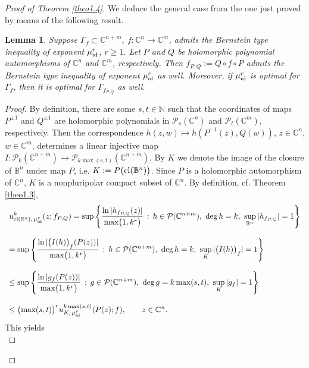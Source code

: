 \documentclass[11pt, oneside]{amsart}
\newtheorem{Lm}[Th]{Lemma}
\begin{document}
\begin{proof}[Proof of Theorem \ref{theo1.4}]
We deduce the general case from the one just proved by means of the following result.
\begin{Lm}\label{lem4.1}
Suppose $\Gamma_f\subset\mathbb C^{n+m}$, $f:\mathbb C^n\rightarrow\mathbb C^m$, admits the Bernstein type inequality of exponent $\mu_{{\rm id}}^r$, $r\ge 1$. Let $P$ and $Q$ be holomorphic polynomial automorphisms of $\mathbb C^n$ and $\mathbb C^m$, respectively. Then $f_{P,Q}:=Q\circ f\circ P$ admits the Bernstein type inequality of exponent $\mu_{{\rm id}}^r$ as well. Moreover, if $\mu_{{\rm id}}^r$ is optimal for $\Gamma_f$, then it is optimal for $\Gamma_{f_{P,Q}}$ as well.
\end{Lm}
\begin{proof}
By definition, there are some $s, t\in\mathbb N$ such that the coordinates of maps $P^{\pm 1}$ and $Q^{\pm 1}$ are holomorphic polynomials in $\mathcal P_{s}(\mathbb C^n)$ and $\mathcal P_t(\mathbb C^m)$, respectively. Then the correspondence $h(z,w)\mapsto h(P^{-1}(z),Q(w))$, $z\in\mathbb C^n$, $w\in\mathbb C^m$, determines a linear injective map $I:\mathcal P_k(\mathbb C^{n+m})\rightarrow \mathcal P_{k\max(s,t)}(\mathbb C^{n+m})$.
 By $K$ we denote the image of the closure of $\mathbb B^n$ under map $P$, i.e. $K:=P\bigl({\rm cl}(\mathbb B^n)\bigr)$.
Since $P$ is a holomorphic automorphism of $\mathbb C^n$, $K$ is a nonpluripolar compact subset of $\mathbb C^n$.
By definition, cf. Theorem \ref{theo1.3},
\[
\begin{array}{l}
\displaystyle
u^{k}_{{\rm cl}(\mathbb B^n),\,\mu_{{\rm id}}^r}(z;f_{P,Q})=
\sup\left\{\frac{\ln |h_{f_{P,Q}}(z)|}{\max\bigl(1,k^r\bigr)}\, :\, h\in\mathcal P(\mathbb C^{n+m}),\ {\rm deg}\,h= k,\ \sup_{\mathbb B^n}|h_{f_{P,Q}}|=1\right\}\\
\\
\displaystyle =\sup\left\{\frac{\ln |\bigl(I(h)\bigr)_{f}(P(z))|}{\max\bigl(1,k^r\bigr)}\, :\, h\in\mathcal P(\mathbb C^{n+m}),\ {\rm deg}\,h= k,\ \sup_{K}|\bigl(I(h)\bigr)_{f}|=1\right\}\\
\\
\displaystyle \le \sup\left\{\frac{\ln |g_{f}(P(z))|}{\max\bigl(1,k^r\bigr)}\, :\, g\in\mathcal P(\mathbb C^{n+m}),\ {\rm deg}\,g= k\max(s,t),\ \sup_{K}|g_{f}|=1\right\}\\
\\
\displaystyle \le\bigl(\max(s,t)\bigr)^r u_{K,\,\mu_{{\rm id}}^r}^{k\max(s,t)}(P(z);f),\qquad z\in\mathbb C^n.
\end{array}
\]
This yields\smallskip
\begin{equation}\label{eq4.20}

\end{equation}
\end{proof}
\end{proof}
\end{document}
